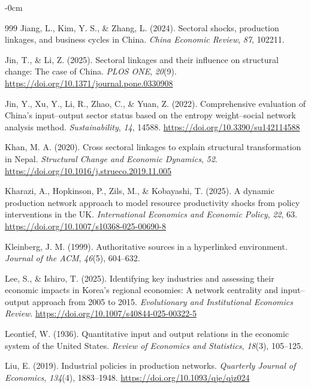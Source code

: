\documentclass[journal,article,submit,pdftex,moreauthors]{Definitions/mdpi}
\begin{document}
\begin{adjustwidth}{-\extralength}{0cm}
{\begin{thebibliography}{999}
Jiang, L., Kim, Y. S., \& Zhang, L. (2024). Sectoral shocks, production linkages, and business cycles in China. \textit{China Economic Review}, \textit{87}, 102211.

Jin, T., \& Li, Z. (2025). Sectoral linkages and their influence on structural change: The case of China. \textit{PLOS ONE}, \textit{20}(9). \url{https://doi.org/10.1371/journal.pone.0330908}

Jin, Y., Xu, Y., Li, R., Zhao, C., \& Yuan, Z. (2022). Comprehensive evaluation of China’s input--output sector status based on the entropy weight--social network analysis method. \textit{Sustainability}, \textit{14}, 14588. \url{https://doi.org/10.3390/su142114588}

Khan, M. A. (2020). Cross sectoral linkages to explain structural transformation in Nepal. \textit{Structural Change and Economic Dynamics}, \textit{52}. \url{https://doi.org/10.1016/j.strueco.2019.11.005}

Kharazi, A., Hopkinson, P., Zils, M., \& Kobayashi, T. (2025). A dynamic production network approach to model resource productivity shocks from policy interventions in the UK. \textit{International Economics and Economic Policy}, \textit{22}, 63. \url{https://doi.org/10.1007/s10368-025-00690-8}

Kleinberg, J. M. (1999). Authoritative sources in a hyperlinked environment. \textit{Journal of the ACM}, \textit{46}(5), 604--632.

Lee, S., \& Ishiro, T. (2025). Identifying key industries and assessing their economic impacts in Korea's regional economies: A network centrality and input--output approach from 2005 to 2015. \textit{Evolutionary and Institutional Economics Review}. \url{https://doi.org/10.1007/s40844-025-00322-5}

Leontief, W. (1936). Quantitative input and output relations in the economic system of the United States. \textit{Review of Economics and Statistics}, \textit{18}(3), 105--125.

Liu, E. (2019). Industrial policies in production networks. \textit{Quarterly Journal of Economics}, \textit{134}(4), 1883--1948. \url{https://doi.org/10.1093/qje/qjz024}


\end{thebibliography}}
\end{adjustwidth}
\end{document}
